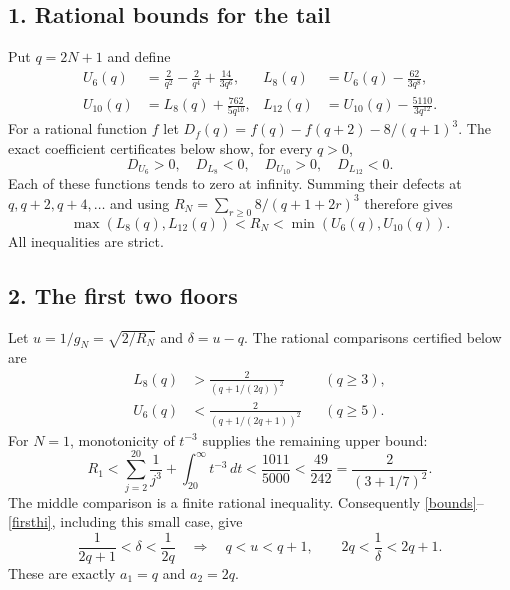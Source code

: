 \documentclass[11pt]{article}
\begin{document}
\subsection*{1. Rational bounds for the tail}
Put $q=2N+1$ and define
\begin{align*}
 U_6(q)&=\frac2{q^2}-\frac2{q^4}+\frac{14}{3q^6},&
 L_8(q)&=U_6(q)-\frac{62}{3q^8},\\
 U_{10}(q)&=L_8(q)+\frac{762}{5q^{10}},&
 L_{12}(q)&=U_{10}(q)-\frac{5110}{3q^{12}}.
\end{align*}
For a rational function $f$ let
$D_f(q)=f(q)-f(q+2)-8/(q+1)^3$.
The exact coefficient certificates below show, for every $q>0$,
\[
 D_{U_6}>0,\quad D_{L_8}<0,\quad D_{U_{10}}>0,\quad D_{L_{12}}<0.
\]
Each of these functions tends to zero at infinity. Summing their
defects at $q,q+2,q+4,\ldots$ and using
$R_N=\sum_{r\ge0}8/(q+1+2r)^3$ therefore gives
\begin{equation}\label{bounds}
 \max(L_8(q),L_{12}(q))<R_N<\min(U_6(q),U_{10}(q)).
\end{equation}
All inequalities are strict.

\subsection*{2. The first two floors}
Let $u=1/g_N=\sqrt{2/R_N}$ and $\delta=u-q$.
The rational comparisons certified below are
\begin{align}
 L_8(q)&>\frac2{(q+1/(2q))^2} &&(q\ge3),\label{firstlo}\\
 U_6(q)&<\frac2{(q+1/(2q+1))^2} &&(q\ge5).\label{firsthi}
\end{align}
For $N=1$, monotonicity of $t^{-3}$ supplies the remaining upper bound:
\[
 R_1<\sum_{j=2}^{20}\frac1{j^3}+\int_{20}^{\infty}t^{-3}\,dt
 <\frac{1011}{5000}<\frac{49}{242}
 =\frac2{(3+1/7)^2}.
\]
The middle comparison is a finite rational inequality.
Consequently \eqref{bounds}--\eqref{firsthi}, including this small case,
give
\[
 \frac1{2q+1}<\delta<\frac1{2q}
 \quad\Longrightarrow\quad
 q<u<q+1,\qquad 2q<\frac1\delta<2q+1.
\]
These are exactly $a_1=q$ and $a_2=2q$.
\end{document}
